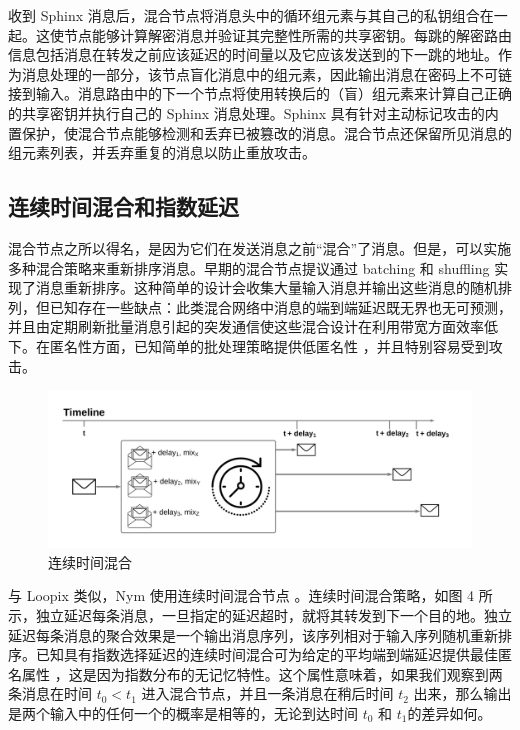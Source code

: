 \documentclass{article}
\begin{document}
	收到 Sphinx 消息后，混合节点将消息头中的循环组元素与其自己的私钥组合在一起。这使节点能够计算解密消息并验证其完整性所需的共享密钥。每跳的解密路由信息包括消息在转发之前应该延迟的时间量以及它应该发送到的下一跳的地址。作为消息处理的一部分，该节点盲化消息中的组元素，因此输出消息在密码上不可链接到输入。消息路由中的下一个节点将使用转换后的（盲）组元素来计算自己正确的共享密钥并执行自己的 Sphinx 消息处理。Sphinx 具有针对主动标记攻击的内置保护\cite{ref88}，使混合节点能够检测和丢弃已被篡改的消息。混合节点还保留所见消息的组元素列表，并丢弃重复的消息以防止重放攻击。\newline

	\subsection{连续时间混合和指数延迟}

	混合节点之所以得名，是因为它们在发送消息之前“混合”了消息。但是，可以实施多种混合策略来重新排序消息。早期的混合节点提议通过 batching 和 shuffling \cite{ref16} 实现了消息重新排序。这种简单的设计会收集大量输入消息并输出这些消息的随机排列，但已知存在一些缺点：此类混合网络中消息的端到端延迟既无界也无可预测，并且由定期刷新批量消息引起的突发通信使这些混合设计在利用带宽方面效率低下。在匿名性方面，已知简单的批处理策略提供低匿名性 \cite{ref35, ref37}，并且特别容易受到攻击\cite{ref26, ref31, ref95}。\newline
	
\begin{figure}
\centering
\includegraphics[width=1\textwidth]{image4.png} %
\caption{连续时间混合} %
\label{图 4} %
\end{figure}

	与 Loopix \cite{ref89} 类似，Nym 使用连续时间混合节点 \cite{ref66} 。连续时间混合策略，如图 4 所示，独立延迟每条消息，一旦指定的延迟超时，就将其转发到下一个目的地。独立延迟每条消息的聚合效果是一个输出消息序列，该序列相对于输入序列随机重新排序。已知具有指数选择延迟的连续时间混合可为给定的平均端到端延迟提供最佳匿名属性 \cite{ref24}，这是因为指数分布的无记忆特性。这个属性意味着，如果我们观察到两条消息在时间 $t_{0} < t_{1}$ 进入混合节点，并且一条消息在稍后时间 $t_{2}$ 出来，那么输出是两个输入中的任何一个的概率是相等的，无论到达时间 $t_{0}$ 和 $t_{1}$的差异如何。\newline
\end{document}
